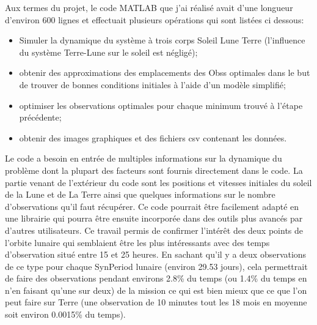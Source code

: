 \documentclass[11pt]{article} %
\begin{document}
		Aux termes du projet, le code MATLAB que j'ai réalisé avait d'une longueur d'environ 600 lignes et effectuait plusieurs opérations qui sont listées ci dessous: 
		
		\begin{itemize}
			\item Simuler la dynamique du système à trois corps Soleil Lune Terre (l'influence du système Terre-Lune sur le soleil est négligé);
			\item obtenir des approximations des emplacements des \glspl{Obs} optimales dans le but de trouver de bonnes conditions initiales à l'aide d'un modèle simplifié;
			\item optimiser les observations optimales pour chaque minimum trouvé à l'étape précédente;
			\item obtenir des images graphiques et des fichiers csv contenant les données.
		\end{itemize}
		
		Le code a besoin en entrée de multiples informations sur la dynamique du problème dont la plupart des facteurs sont fournis directement dans le code. La partie venant de l'extérieur du code sont les positions et vitesses initiales du soleil de la Lune et de La Terre ainsi que quelques informations sur le nombre d'observations qu'il faut récupérer.
		Ce code pourrait être facilement adapté en une librairie qui pourra être ensuite incorporée dans des outils plus avancés par d'autres utilisateurs.
		Ce travail permis de confirmer l'intérêt des deux points de l'orbite lunaire qui semblaient être les plus intéressants avec des temps d'observation situé entre 15 et 25 heures. En sachant qu'il y a deux observations de ce type pour chaque \gls{SynPeriod} lunaire (environ 29.53 jours), cela permettrait de faire des observations pendant environs 2.8\% du temps (ou 1.4\% du temps en n'en faisant qu'une sur deux) de la mission ce qui est bien mieux que ce que l'on peut faire sur Terre (une observation de 10 minutes tout les 18 mois en moyenne soit environ 0.0015\% du temps).
		
\end{document}
